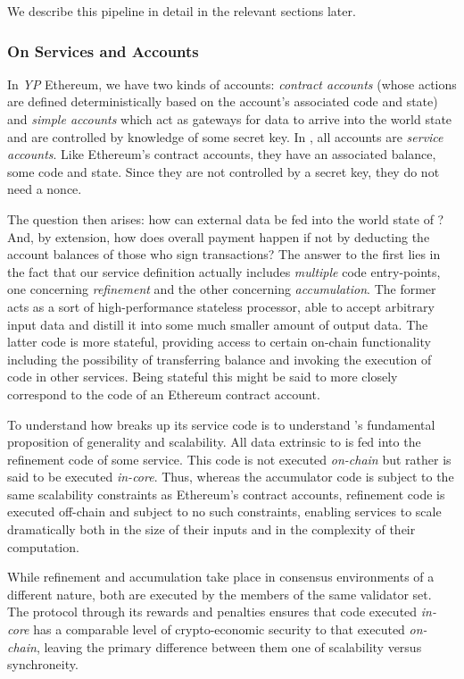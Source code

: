We describe this pipeline in detail in the relevant sections later.

\subsubsection{On Services and Accounts}


In \emph{YP} Ethereum, we have two kinds of accounts: \emph{contract accounts} (whose actions are defined deterministically based on the account's associated code and state) and \emph{simple accounts} which act as gateways for data to arrive into the world state and are controlled by knowledge of some secret key. In \Jam, all accounts are \emph{service accounts}. Like Ethereum's contract accounts, they have an associated balance, some code and state. Since they are not controlled by a secret key, they do not need a nonce.

The question then arises: how can external data be fed into the world state of \Jam? And, by extension, how does overall payment happen if not by deducting the account balances of those who sign transactions? The answer to the first lies in the fact that our service definition actually includes \emph{multiple} code entry-points, one concerning \emph{refinement} and the other concerning \emph{accumulation}. The former acts as a sort of high-performance stateless processor, able to accept arbitrary input data and distill it into some much smaller amount of output data. The latter code is more stateful, providing access to certain on-chain functionality including the possibility of transferring balance and invoking the execution of code in other services. Being stateful this might be said to more closely correspond to the code of an Ethereum contract account.

To understand how \Jam breaks up its service code is to understand \Jam's fundamental proposition of generality and scalability. All data extrinsic to \Jam is fed into the refinement code of some service. This code is not executed \emph{on-chain} but rather is said to be executed \emph{in-core}. Thus, whereas the accumulator code is subject to the same scalability constraints as Ethereum's contract accounts, refinement code is executed off-chain and subject to no such constraints, enabling \Jam services to scale dramatically both in the size of their inputs and in the complexity of their computation.

While refinement and accumulation take place in consensus environments of a different nature, both are executed by the members of the same validator set. The \Jam protocol through its rewards and penalties ensures that code executed \emph{in-core} has a comparable level of crypto-economic security to that executed \emph{on-chain}, leaving the primary difference between them one of scalability versus synchroneity.

